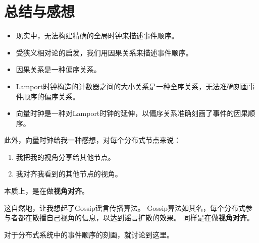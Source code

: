 \documentclass[cn,11pt,chinese]{elegantbook}
\providecommand{\tightlist}{%
  \setlength{\itemsep}{0pt}\setlength{\parskip}{0pt}}
\begin{document}
\hypertarget{ux603bux7ed3ux4e0eux611fux60f3}{%
\section{总结与感想}\label{ux603bux7ed3ux4e0eux611fux60f3}}

\begin{itemize}
\tightlist
\item
  现实中，无法构建精确的全局时钟来描述事件顺序。
\item
  受狭义相对论的启发，我们用因果关系来描述事件顺序。
\item
  因果关系是一种偏序关系。
\item
  Lamport时钟构造的计数器之间的大小关系是一种全序关系，无法准确刻画事件顺序的偏序关系。
\item
  向量时钟是一种对Lamport时钟的延伸，以偏序关系准确刻画了事件的因果顺序。
\end{itemize}

此外，向量时钟给我一种感想，对每个分布式节点来说：

\begin{enumerate}
\def\labelenumi{\arabic{enumi}.}
\tightlist
\item
  我把我的视角分享给其他节点。
\item
  我对齐我看到的其他节点的视角。
\end{enumerate}

本质上，是在做\textbf{视角对齐}。

这自然地，让我想起了Gossip谣言传播算法。
Gossip算法如其名，每个分布式参与者都在散播自己视角的信息，以达到谣言扩散的效果。
同样是在做\textbf{视角对齐}。

对于分布式系统中的事件顺序的刻画，就讨论到这里。

\backmatter
\end{document}
